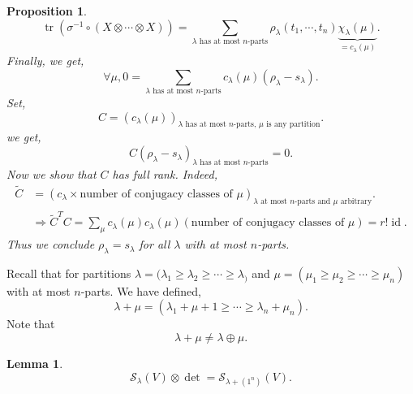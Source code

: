 \documentclass[10pt]{article}
\newtheorem{proposition}{Proposition}[section]
\newtheorem{lemma}{Lemma}[section]
\numberwithin{equation}{theorem}
\DeclareMathOperator{\tr}{tr}
\DeclareMathOperator{\id}{id}
\begin{document}
\begin{proposition}
  \begin{equation*}
    \tr(\sigma^{-1}\circ(X\otimes \cdots \otimes X))=\sum_{\text{$\lambda$ has at most $n$-parts}}\rho_{\lambda}(t_1,\cdots,t_n)\underbrace{\chi_\lambda(\mu)}_{=c_\lambda(\mu)}.
  \end{equation*}
  Finally, we get,
  \begin{equation*}
    \forall \mu, 0 = \sum_{\text{$\lambda$ has at most $n$-parts}}c_\lambda(\mu)(\rho_\lambda-s_\lambda).
  \end{equation*}
  Set, 
  \begin{equation*}
    C = (c_\lambda(\mu))_{\text{$\lambda$ has at most $n$-parts, $\mu$ is any partition}}.
  \end{equation*}
  we get,
  \begin{equation*}
     C(\rho_\lambda-s_\lambda)_{\text{$\lambda$ has at most $n$-parts}} = 0.
  \end{equation*}
  Now we show that $C$ has full rank. Indeed,
  \begin{align*}
    \tilde{C} &= (c_\lambda\times \text{number of conjugacy classes of $\mu$})_{\text{$\lambda$ at most $n$-parts and $\mu$ arbitrary}}.\\
    & \Rightarrow \tilde{C}^TC = \sum_{\mu}c_\lambda(\mu)c_\lambda(\mu)(\text{number of conjugacy classes of $\mu$}) = r!\id.
  \end{align*}
  Thus we conclude $\rho_\lambda = s_\lambda$ for all $\lambda$ with at most $n$-parts.
\end{proposition}
Recall that for partitions $\lambda = (\lambda_1\geq\lambda_2\geq \cdots\geq\lambda_)$ and $\mu=(\mu_1\geq\mu_2\geq\cdots\geq \mu_n)$ with at most $n$-parts. We have defined,
\begin{equation*}
  \lambda+\mu = (\lambda_1+\mu+1\geq\cdots\geq\lambda_n+\mu_n).
\end{equation*}
Note that 
\begin{equation*}
  \lambda+\mu \not = \lambda\oplus\mu.
\end{equation*}
\begin{lemma}
  \label{lemma_4_11}
  \begin{equation*}
    \mathcal{S}_\lambda(V)\otimes \det = \mathcal{S}_{\lambda+(1^n)}(V).
  \end{equation*}
\end{lemma}
\end{document}
